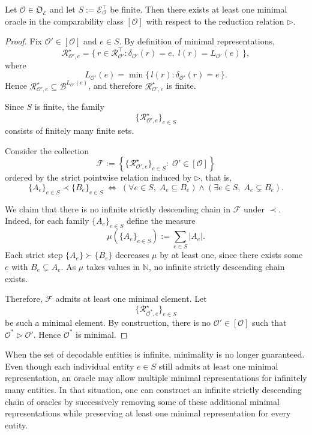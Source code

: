 \begin{proposition}
\label{prop:existence_minimal_finite}
Let $\mathcal{O} \in \mathfrak{O}_{\mathcal{E}}$ and let $S := \mathcal{E}^\top_{\mathcal{O}}$ be finite. Then there exists at least one minimal oracle in the comparability class $[\mathcal{O}]$ with respect to the reduction relation $\triangleright$.
\end{proposition}

\begin{proof}
Fix $\mathcal{O}' \in [\mathcal{O}]$ and $e \in S$. By definition of minimal representations,
\[
\mathcal{R}^\star_{\mathcal{O}', e}
=
\{\, r \in \mathcal{R}^\top_{\mathcal{O}'} : \delta_{\mathcal{O}'}(r)=e,\; l(r)=L_{\mathcal{O}'}(e) \,\},
\]
where
\[
L_{\mathcal{O}'}(e)
=
\min \{\, l(r) : \delta_{\mathcal{O}'}(r)=e \,\}.
\]
Hence $\mathcal{R}^\star_{\mathcal{O}', e} \subseteq \mathcal{B}^{L_{\mathcal{O}'}(e)}$, and therefore $\mathcal{R}^\star_{\mathcal{O}', e}$ is finite.

Since $S$ is finite, the family
\[
\bigl\{ \mathcal{R}^\star_{\mathcal{O}', e} \bigr\}_{e \in S}
\]
consists of finitely many finite sets.

Consider the collection
\[
\mathcal{F}
:=
\left\{
\bigl\{ \mathcal{R}^\star_{\mathcal{O}', e} \bigr\}_{e \in S}
:\;
\mathcal{O}' \in [\mathcal{O}]
\right\}
\]
ordered by the strict pointwise relation induced by $\triangleright$, that is,
\[
\bigl\{A_e\bigr\}_{e \in S} \prec \bigl\{B_e\bigr\}_{e \in S}
\;\Longleftrightarrow\;
\left(
\forall e \in S,\; A_e \subseteq B_e
\right)
\wedge
\left(
\exists e \in S,\; A_e \subsetneq B_e
\right).
\]

We claim that there is no infinite strictly descending chain in $\mathcal{F}$ under $\prec$. Indeed, for each family $\{A_e\}_{e \in S}$ define the measure
\[
\mu(\{A_e\}_{e \in S}) := \sum_{e \in S} |A_e|.
\]
Each strict step $\{A_e\} \succ \{B_e\}$ decreases $\mu$ by at least one, since there exists some $e$ with $B_e \subsetneq A_e$. As $\mu$ takes values in $\mathbb{N}$, no infinite strictly descending chain exists.

Therefore, $\mathcal{F}$ admits at least one minimal element. Let
\[
\bigl\{ \mathcal{R}^\star_{\mathcal{O}^\ast, e} \bigr\}_{e \in S}
\]
be such a minimal element. By construction, there is no $\mathcal{O}' \in [\mathcal{O}]$ such that $\mathcal{O}^\ast \triangleright \mathcal{O}'$. Hence $\mathcal{O}^\ast$ is minimal.
\end{proof}

When the set of decodable entities is infinite, minimality is no longer guaranteed. Even though each individual entity $e\in S$ still admits at least one minimal representation, an oracle may allow multiple minimal representations for infinitely many entities. In that situation, one can construct an infinite strictly descending chain of oracles by successively removing some of these additional minimal representations while preserving at least one minimal representation for every entity.

